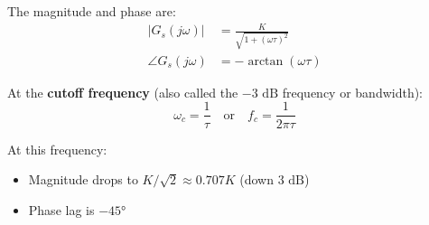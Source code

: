The magnitude and phase are:
\begin{align}
|G_s(j\omega)| &= \frac{K}{\sqrt{1 + (\omega\tau)^2}} \label{eq:first_order_mag}\\
\angle G_s(j\omega) &= -\arctan(\omega\tau) \label{eq:first_order_phase}
\end{align}

At the \textbf{cutoff frequency} (also called the $-3\text{ dB}$ frequency or bandwidth):
\begin{equation}
\omega_c = \frac{1}{\tau} \quad \text{or} \quad f_c = \frac{1}{2\pi\tau}
\label{eq:cutoff_freq}
\end{equation}

At this frequency:
\begin{itemize}
    \item Magnitude drops to $K/\sqrt{2} \approx 0.707K$ (down $3\text{ dB}$)
    \item Phase lag is $-45°$
\end{itemize}


